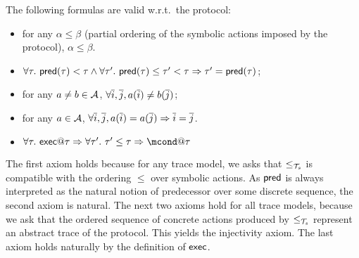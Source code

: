 \begin{proposition}
  The following formulas are valid w.r.t.\ the protocol:
  \begin{itemize}
    \item for any $\alpha \leq \beta$ (partial ordering of the symbolic actions imposed by the protocol), $\alpha \leq \beta$.

    \item
      $\forall \tau.~ \textsf{pred}(\tau)<\tau \wedge
      \forall \tau'.~ \textsf{pred}(\tau)\leq\tau'<\tau \Rightarrow
      \tau'=\textsf{pred}(\tau)$;
    \item for any $a\neq b\in\mathcal{A}$,
      $\forall \overline{i},\overline{j}, a(\overline{i})\neq b(\overline{j})$;
    \item for any $a\in\mathcal{A}$,
      $\forall \overline{i},\overline{j}, a(\overline{i})=a(\overline{j}) \Rightarrow \overline{i}=\overline{j}$.
      \item $\forall \tau.~ \mexec@\tau \Rightarrow \forall \tau'.~\tau'\leq \tau \Rightarrow \mcond@\tau$
  \end{itemize}
\end{proposition}


The first axiom holds because for any trace model, we asks that $\leq_{\mathcal{T}_s}$ is compatible with the ordering $\leq$ over symbolic actions.
As $\textsf{pred}$ is always interpreted as the natural notion of predecessor over some discrete sequence, the second axiom is natural. The next two axioms hold for all trace models, because we ask that the ordered sequence of concrete actions produced by $\leq_{\mathcal{T}_s}$ represent an abstract trace of the protocol. This yields the injectivity axiom. The last axiom holds naturally by the definition of $\textsf{exec}$.

